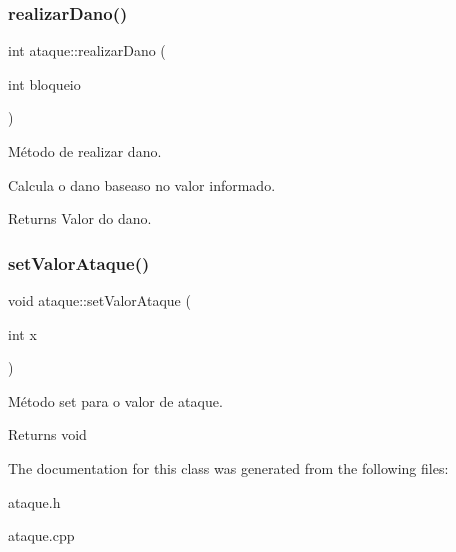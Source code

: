 \subsubsection{\texorpdfstring{realizar\+Dano()}{realizarDano()}}
{\footnotesize\ttfamily int ataque\+::realizar\+Dano (\begin{DoxyParamCaption}\item[{int}]{bloqueio }\end{DoxyParamCaption})}



Método de realizar dano. 

Calcula o dano baseaso no valor informado. \begin{DoxyReturn}{Returns}
Valor do dano. 
\end{DoxyReturn}
\mbox{\label{classataque_a398d632b079837ca60dc838671d4614e}} 
\subsubsection{\texorpdfstring{set\+Valor\+Ataque()}{setValorAtaque()}}
{\footnotesize\ttfamily void ataque\+::set\+Valor\+Ataque (\begin{DoxyParamCaption}\item[{int}]{x }\end{DoxyParamCaption})}



Método set para o valor de ataque. 

\begin{DoxyReturn}{Returns}
void 
\end{DoxyReturn}


The documentation for this class was generated from the following files\+:\begin{DoxyCompactItemize}
\item 
ataque.\+h\item 
ataque.\+cpp\end{DoxyCompactItemize}
